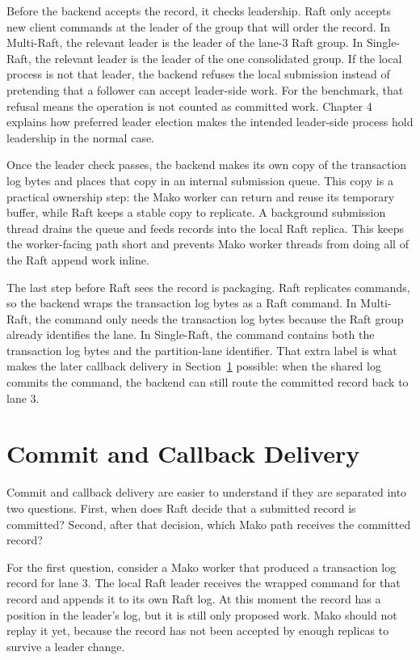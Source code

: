 Before the backend accepts the record, it checks leadership. Raft only accepts
new client commands at the leader of the group that will order the record. In
Multi-Raft, the relevant leader is the leader of the lane-3 Raft group. In
Single-Raft, the relevant leader is the leader of the one consolidated group.
If the local process is not that leader, the backend refuses the local
submission instead of pretending that a follower can accept leader-side work.
For the benchmark, that refusal means the operation is not counted as committed
work. Chapter 4 explains how preferred leader election makes the intended
leader-side process hold leadership in the normal case.

Once the leader check passes, the backend makes its own copy of the transaction
log bytes and places that copy in an internal submission queue. This copy is a
practical ownership step: the Mako worker can return and reuse its temporary
buffer, while Raft keeps a stable copy to replicate. A background submission
thread drains the queue and feeds records into the local Raft replica. This
keeps the worker-facing path short and prevents Mako worker threads from doing
all of the Raft append work inline.

The last step before Raft sees the record is packaging. Raft replicates
commands, so the backend wraps the transaction log bytes as a Raft command. In
Multi-Raft, the command only needs the transaction log bytes because the Raft
group already identifies the lane. In Single-Raft, the command contains both
the transaction log bytes and the partition-lane identifier. That extra label
is what makes the later callback delivery in Section~\ref{sec:commit-callback}
possible: when the shared log commits the command, the backend can still route
the committed record back to lane 3.

\section{Commit and Callback Delivery}
\label{sec:commit-callback}

Commit and callback delivery are easier to understand if they are separated
into two questions. First, when does Raft decide that a submitted record is
committed? Second, after that decision, which Mako path receives the committed
record?

For the first question, consider a Mako worker that produced a transaction log
record for lane 3. The local Raft leader receives the wrapped command for that
record and appends it to its own Raft log. At this moment the record has a
position in the leader's log, but it is still only proposed work. Mako should
not replay it yet, because the record has not been accepted by enough replicas
to survive a leader change.

